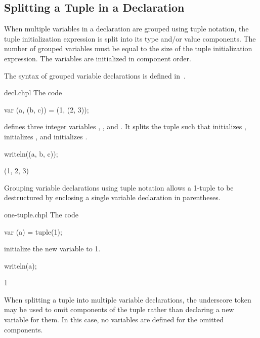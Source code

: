 \subsection{Splitting a Tuple in a Declaration}
\label{Variable_Declarations_in_a_Tuple}

When multiple variables in a declaration are grouped using tuple
notation, the tuple initialization expression is
split into its type and/or value components.  The number of grouped variables must be
equal to the size of the tuple initialization
expression.  The variables are initialized in component order.

The syntax of grouped variable declarations is defined
in~.

\begin{chapelexample}{decl.chpl}
The code
\begin{chapel}
var (a, (b, c)) = (1, (2, 3));
\end{chapel}
defines three integer variables , , and .  It
splits the tuple  such that 
initializes ,  initializes , and 
initializes .
\begin{chapelpost}
writeln((a, b, c));
\end{chapelpost}
\begin{chapeloutput}
(1, 2, 3)
\end{chapeloutput}
\end{chapelexample}

Grouping variable declarations using tuple notation allows a 1-tuple
to be destructured by enclosing a single variable declaration in
parentheses.
\begin{chapelexample}{one-tuple.chpl}
The code
\begin{chapel}
var (a) = tuple(1);
\end{chapel}
initialize the new variable  to 1.
\begin{chapelpost}
writeln(a);
\end{chapelpost}
\begin{chapeloutput}
1
\end{chapeloutput}
\end{chapelexample}

When splitting a tuple into multiple variable declarations, the
underscore token may be used to omit components of the tuple rather
than declaring a new variable for them.  In this case, no variables
are defined for the omitted components.

